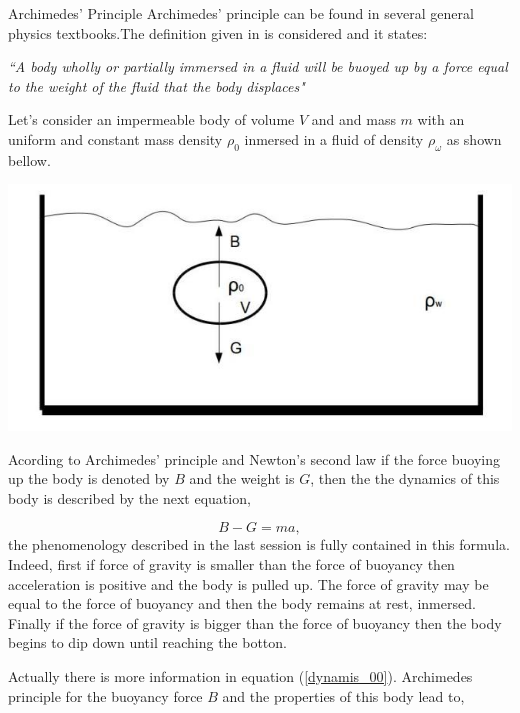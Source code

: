 \begin{section}{Archimedes' Principle}
    Archimedes' principle can be found in several general physics textbooks.The definition
    given in \cite{RESNICK} is considered and it states: 
    
    \textit{``A body wholly or partially immersed in a fluid will be buoyed up by a 
            force equal to the weight of the fluid that the body displaces"}
    
    Let's consider an impermeable body of volume $V$ and and mass $m$ with an uniform and constant 
    mass density $\rho_0$ inmersed in a fluid of density $\rho_{\omega}$ as shown bellow.\\
    
    \begin{center}
        \includegraphics[scale=0.4]{./pics/buoyancy.jpg}
    \end{center}
    
    Acording to Archimedes' principle and Newton's second law if the force buoying up the 
    body is denoted by $B$ and the weight is $G$, then the the dynamics of this body is 
    described by the next equation,
    
    \begin{equation}
        \label{dynamis_00}
        B - G = m a,
    \end{equation}    
    the phenomenology described in the last session is fully contained in this formula. 
    Indeed, first if force of gravity is smaller than the force of buoyancy then 
    acceleration is positive and the body is pulled up. The force of gravity may be
    equal to the force of buoyancy and then the body remains at rest, inmersed. Finally if
    the force of gravity is bigger than the force of buoyancy then the body begins to 
    dip down until reaching the botton.
    
    Actually there is more information in equation (\ref{dynamis_00}). Archimedes principle 
    for the buoyancy force $B$ and the properties of this body lead to,
    

\end{section}
